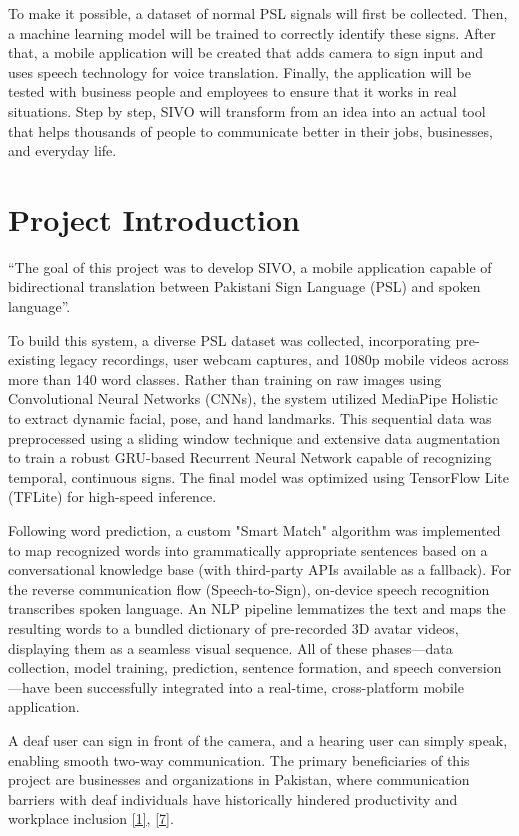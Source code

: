 \documentclass[12pt,a4paper,oneside]{report}
\begin{document}
To make it possible, a dataset of normal PSL signals will first be collected. Then, a machine learning model will be trained to correctly identify these signs. After that, a mobile application will be created that adds camera to sign input and uses speech technology for voice translation. Finally, the application will be tested with business people and employees to ensure that it works in real situations. Step by step, SIVO will transform from an idea into an actual tool that helps thousands of people to communicate better in their jobs, businesses, and everyday life.

\section{Project Introduction}

“The goal of this project was to develop SIVO, a mobile application capable of bidirectional translation between Pakistani Sign Language (PSL) and spoken language”.

To build this system, a diverse PSL dataset was collected, incorporating pre-existing legacy recordings, user webcam captures, and 1080p mobile videos across more than 140 word classes. Rather than training on raw images using Convolutional Neural Networks (CNNs), the system utilized MediaPipe Holistic to extract dynamic facial, pose, and hand landmarks. This sequential data was preprocessed using a sliding window technique and extensive data augmentation to train a robust GRU-based Recurrent Neural Network capable of recognizing temporal, continuous signs. The final model was optimized using TensorFlow Lite (TFLite) for high-speed inference.


Following word prediction, a custom "Smart Match" algorithm was implemented to map recognized words into grammatically appropriate sentences based on a conversational knowledge base (with third-party APIs available as a fallback). For the reverse communication flow (Speech-to-Sign), on-device speech recognition transcribes spoken language. An NLP pipeline lemmatizes the text and maps the resulting words to a bundled dictionary of pre-recorded 3D avatar videos, displaying them as a seamless visual sequence.
All of these phases—data collection, model training, prediction, sentence formation, and speech conversion—have been successfully integrated into a real-time, cross-platform mobile application. 


A deaf user can sign in front of the camera, and a hearing user can simply speak, enabling smooth two-way communication. The primary beneficiaries of this project are businesses and organizations in Pakistan, where communication barriers with deaf individuals have historically hindered productivity and workplace inclusion \hyperlink{ref1}{[1]}, \hyperlink{ref7}{[7]}.
\end{document}
